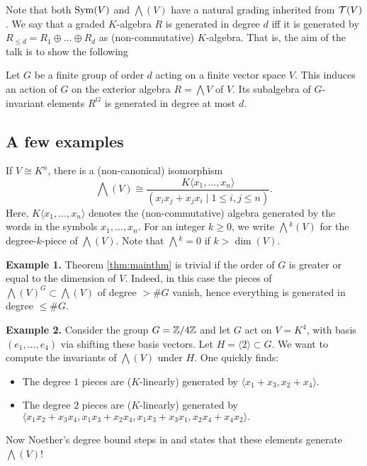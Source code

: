 \documentclass[../main.tex]{subfiles}
\begin{document}
Note that both $\operatorname{Sym}(V)$ and $\bigwedge(V)$ have a natural grading inherited from
$\mathcal{T}(V)$. 
We say that a graded $K$-algebra $R$ is generated in degree $d$ iff it is
generated by $R_{\leq d} = R_1 \oplus \dots \oplus R_d$ as (non-commutative)
$K$-algebra.  That is, the aim of the talk is to show the following 
\begin{thm}\label{thm:mainthm}
    Let $G$ be a finite group of order $d$ acting on a finite vector space $V$.
    This induces an action of $G$ on the exterior algebra $R = \bigwedge V$ of $V$.
    Its subalgebra of $G$-invariant elements $R^G$ is generated in
    degree at most $d$.
\end{thm}

\subsection{A few examples} %
\label{sub:Some examples}
If $V \cong K^n$, there is a (non-canonical) isomorphism
\begin{equation*}
    \bigwedge(V) \cong \frac{K\langle x_1, \dots, x_n \rangle}{(x_i x_j + x_j
    x_i \mid 1 \leq i,j \leq n)}.
\end{equation*}
Here, $K\langle x_1, \dots, x_n \rangle$ denotes the (non-commutative) algebra generated
by the words in the symbols $x_1, \dots, x_n$.
For an integer $k \geq 0$, we write $\bigwedge{}^k(V)$ for the degree-$k$-piece of 
$\bigwedge(V)$. Note that $\bigwedge{}^k = 0$ if $k > \dim(V)$. 

\textbf{Example 1.} Theorem \ref{thm:mainthm} is trivial if the order of $G$ is greater
or equal to the dimension of $V$. Indeed, in this case the pieces of
$\bigwedge(V)^G \subset \bigwedge(V)$ of degree $>\# G$ vanish, hence
everything is generated in degree $\leq \# G$.

\textbf{Example 2.} Consider the group $G = \mathbb{Z}/4\mathbb{Z}$ and let $G$ act on 
$V = K^4$, with basis $(e_1, \dots, e_4)$ via shifting these basis vectors.
Let $H = \langle 2 \rangle \subset G$. We want to compute the invariants of
$\bigwedge(V)$ under $H$. One quickly finds:
\begin{itemize}
    \item The degree $1$ pieces are ($K$-linearly) generated by $\langle x_1 +
        x_3, x_2 + x_4 \rangle$.
    \item The degree $2$ pieces are ($K$-linearly) generated by $\langle x_1
        x_2 + x_3x_4, x_1 x_3 + x_2 x_4, x_1x_3+x_3x_1,  x_2x_4 + x_4x_2
        \rangle.$
\end{itemize}
Now Noether's degree bound steps in and states that these elements generate
$\bigwedge(V)$! 
\end{document}
